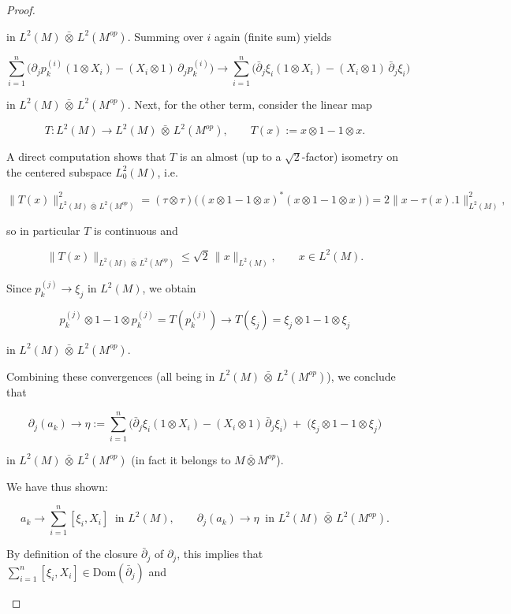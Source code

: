 \documentclass[10pt,a4paper,reqno]{amsart}
\newcommand{\Dom}{\mathrm{Dom}}
\begin{document}
\begin{proof}
\begin{enumerate}
in $L^2(M)\,\bar\otimes\,L^2(M^{op})$.
\newline
Summing over $i$ again (finite sum) yields


\[
\sum_{i=1}^n\Big(\partial_j p_k^{(i)}(1\otimes X_i)
                 - (X_i\otimes 1)\,\partial_j p_k^{(i)}\Big)
 \longrightarrow
\sum_{i=1}^n\Big(\bar\partial_j\xi_i(1\otimes X_i)
                 - (X_i\otimes 1)\,\bar\partial_j\xi_i\Big)
\]


in $L^2(M)\,\bar\otimes\,L^2(M^{op})$.
\newline
Next, for the other term, consider the linear map 


\[
T:L^2(M)\to L^2(M)\,\bar\otimes\,L^2(M^{op}),\qquad T(x):=x\otimes 1 - 1\otimes x.
\]


A direct computation shows that $T$ is an almost (up to a $\sqrt{2}$-factor) isometry on the centered subspace $L^2_0(M)$, i.e. 


\[
\|T(x)\|_{L^2(M)\,\bar\otimes\,L^2(M^{op})}^2
 = (\tau\otimes\tau)\big((x\otimes 1-1\otimes x)^\ast(x\otimes 1-1\otimes x)\big)
 = 2\|x-\tau(x).1\|_{L^2(M)}^2,
\]


so in particular $T$ is continuous and


\[
\|T(x)\|_{L^2(M)\,\bar\otimes\,L^2(M^{op})}
 \le \sqrt{2}\,\|x\|_{L^2(M)},\qquad x\in L^2(M).
\]


Since $p_k^{(j)}\to \xi_j$ in $L^2(M)$, we obtain


\[
p_k^{(j)}\otimes 1 - 1\otimes p_k^{(j)} = T(p_k^{(j)}) \longrightarrow T(\xi_j)
 = \xi_j\otimes 1 - 1\otimes \xi_j
\]


in $L^2(M)\,\bar\otimes\,L^2(M^{op})$.

Combining these convergences (all being in $L^2(M)\,\bar\otimes\,L^2(M^{op})$), we conclude that


\[
\partial_j(a_k)
 \longrightarrow 
\eta := \sum_{i=1}^n\Big(\bar\partial_j\xi_i(1\otimes X_i)
                         - (X_i\otimes 1)\,\bar\partial_j\xi_i\Big)
       \;+\; \big(\xi_j\otimes 1 - 1\otimes \xi_j\big)
\]


in $L^2(M)\,\bar\otimes\,L^2(M^{op})$ (in fact it belongs to $M\bar\otimes M^{op}$).

We have thus shown:


\[
a_k\to \sum_{i=1}^n[\xi_i,X_i] \ \text{ in }L^2(M),
\qquad
\partial_j(a_k)\to \eta \ \text{ in }L^2(M)\,\bar\otimes\,L^2(M^{op}).
\]


By definition of the closure $\bar\partial_j$ of $\partial_j$, this implies that
$\sum_{i=1}^n [\xi_i,X_i]\in \Dom(\bar\partial_j)$ and



\end{enumerate}
\end{proof}
\end{document}
